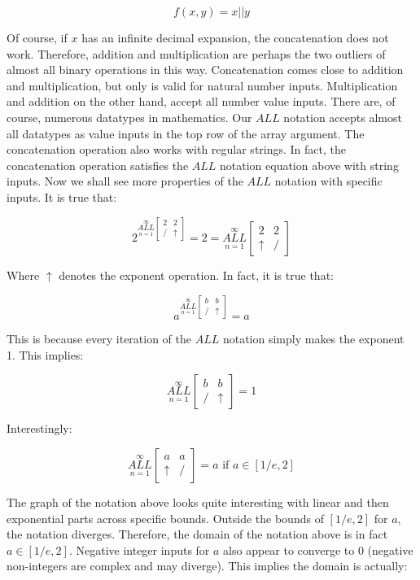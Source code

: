 \documentclass{article}
\begin{document}
$$f(x,y) = x||y$$

Of course, if $x$ has an infinite decimal expansion, the concatenation does not work. Therefore, addition and multiplication are perhaps the two outliers of almost all binary operations in this way. Concatenation comes close to addition and multiplication, but only is valid for natural number inputs. Multiplication and addition on the other hand, accept all number value inputs. There are, of course, numerous datatypes in mathematics. Our $ALL$ notation accepts almost all datatypes as value inputs in the top row of the array argument. The concatenation operation also works with regular strings. In fact, the concatenation operation satisfies the $ALL$ notation equation above with string inputs. Now we shall see more properties of the $ALL$ notation with specific inputs. It is true that:

$$2^{\underset{n=1}{\overset{\infty}{ALL}} \begin{bmatrix}
2 & 2 \\
/ & \uparrow
\end{bmatrix}} = 2 = \underset{n=1}{\overset{\infty}{ALL}} \begin{bmatrix}
2 & 2 \\
\uparrow & /
\end{bmatrix}$$

Where $\uparrow$ denotes the exponent operation. In fact, it is true that:

$$a^{\underset{n=1}{\overset{\infty}{ALL}} \begin{bmatrix}
b & b \\
/ & \uparrow
\end{bmatrix}} = a$$

This is because every iteration of the $ALL$ notation simply makes the exponent 1. This implies:

$$\underset{n=1}{\overset{\infty}{ALL}} \begin{bmatrix}
b & b \\
/ & \uparrow
\end{bmatrix}=1$$

Interestingly:

$$\underset{n=1}{\overset{\infty}{ALL}} \begin{bmatrix}
a & a \\
\uparrow & /
\end{bmatrix} =a\text{ if }a\in[1/e,2]$$

The graph of the notation above looks quite interesting with linear and then exponential parts across specific bounds. Outside the bounds of $[1/e,2]$ for $a$, the notation diverges. Therefore, the domain of the notation above is in fact $a\in[1/e,2]$. Negative integer inputs for $a$ also appear to converge to 0 (negative non-integers are complex and may diverge). This implies the domain is actually:
\end{document}
